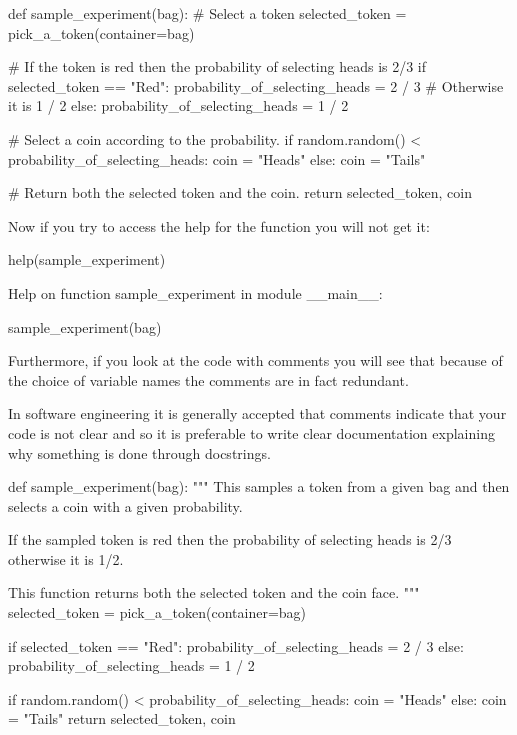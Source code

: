 \begin{pyin}
def sample_experiment(bag):
    # Select a token
    selected_token = pick_a_token(container=bag)

    # If the token is red then the probability of selecting heads is 2/3
    if selected_token == "Red":
        probability_of_selecting_heads = 2 / 3
    # Otherwise it is 1 / 2
    else:
        probability_of_selecting_heads = 1 / 2

    # Select a coin according to the probability.
    if random.random() < probability_of_selecting_heads:
        coin = "Heads"
    else:
        coin = "Tails"

    # Return both the selected token and the coin.
    return selected_token, coin
\end{pyin}






Now if you try to access the help for the function you will not get it:




\begin{pyin}
help(sample_experiment)
\end{pyin}





\begin{raw}
Help on function sample_experiment in module __main__:

sample_experiment(bag)
\end{raw}


Furthermore, if you look at the code with comments you will see that because of
the choice of variable names the comments are in fact redundant.

In software engineering it is generally accepted that comments indicate that
your code is not clear and so it is preferable to write clear documentation
explaining why something is done through docstrings.




\begin{pyin}
def sample_experiment(bag):
    """
    This samples a token from a given bag and then
    selects a coin with a given probability.

    If the sampled token is red then the probability
    of selecting heads is 2/3 otherwise it is 1/2.

    This function returns both the selected token
    and the coin face.
    """
    selected_token = pick_a_token(container=bag)

    if selected_token == "Red":
        probability_of_selecting_heads = 2 / 3
    else:
        probability_of_selecting_heads = 1 / 2

    if random.random() < probability_of_selecting_heads:
        coin = "Heads"
    else:
        coin = "Tails"
    return selected_token, coin
\end{pyin}
